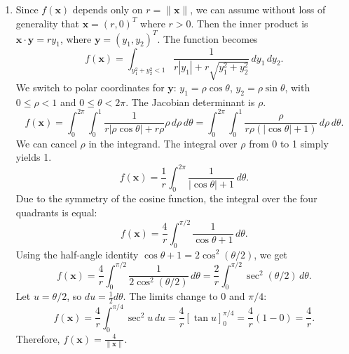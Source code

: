 \documentclass{article}
\begin{document}
\begin{enumerate}[label=\fbox{\arabic*}]
\begin{enumerate}[label=(\arabic*)]
          \item Since $f(\bm{x})$ depends only on $r = \|\bm{x}\|$, we can assume without loss of generality that $\bm{x} = (r, 0)^T$ where $r > 0$. 
          Then the inner product is $\bm{x} \cdot \bm{y} = r y_1$, where $\bm{y} = (y_1, y_2)^T$. The function becomes
          \[
            f(\bm{x}) = \int_{y_1^2 + y_2^2 < 1} \frac{1}{r |y_1| + r \sqrt{y_1^2 + y_2^2}} \, dy_1 \, dy_2.
          \]
          We switch to polar coordinates for $\bm{y}$: $y_1 = \rho \cos \theta$, $y_2 = \rho \sin \theta$, with $0 \le \rho < 1$ and $0 \le \theta < 2\pi$. The Jacobian determinant is $\rho$.
          \[
            f(\bm{x}) = \int_0^{2\pi} \int_0^1 \frac{1}{r|\rho \cos \theta| + r\rho} \rho \, d\rho \, d\theta = \int_0^{2\pi} \int_0^1 \frac{\rho}{r\rho (|\cos \theta| + 1)} \, d\rho \, d\theta.
          \]
          We can cancel $\rho$ in the integrand. The integral over $\rho$ from 0 to 1 simply yields 1. 
          \[
            f(\bm{x}) = \frac{1}{r} \int_0^{2\pi} \frac{1}{|\cos \theta| + 1} \, d\theta.
          \]
          Due to the symmetry of the cosine function, the integral over the four quadrants is equal:
          \[
            f(\bm{x}) = \frac{4}{r} \int_0^{\pi/2} \frac{1}{\cos \theta + 1} \, d\theta.
          \]
          Using the half-angle identity $\cos \theta + 1 = 2 \cos^2(\theta/2)$, we get
          \[
            f(\bm{x}) = \frac{4}{r} \int_0^{\pi/2} \frac{1}{2 \cos^2(\theta/2)} \, d\theta = \frac{2}{r} \int_0^{\pi/2} \sec^2(\theta/2) \, d\theta.
          \]
          Let $u = \theta/2$, so $du = \frac{1}{2} d\theta$. The limits change to $0$ and $\pi/4$:
          \[
            f(\bm{x}) = \frac{4}{r} \int_0^{\pi/4} \sec^2 u \, du = \frac{4}{r} [\tan u]_0^{\pi/4} = \frac{4}{r} (1 - 0) = \frac{4}{r}.
          \]
          Therefore, $f(\bm{x}) = \frac{4}{\|\bm{x}\|}$.
        \end{enumerate}


\end{enumerate}
\end{document}

